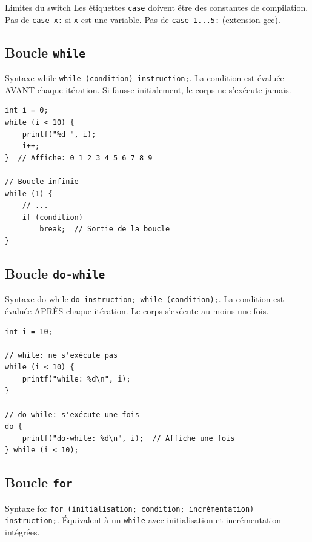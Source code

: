 \documentclass[10pt,a4paper]{article}
\begin{document}
\begin{warningbox}{Limites du switch}
Les étiquettes \texttt{case} doivent être des constantes de compilation. Pas de \texttt{case x:} si \texttt{x} est une variable. Pas de \texttt{case 1...5:} (extension gcc).
\end{warningbox}

\subsection{Boucle \texttt{while}}

\begin{definitionbox}{Syntaxe while}
\texttt{while (condition) instruction;}. La condition est évaluée AVANT chaque itération. Si fausse initialement, le corps ne s'exécute jamais.
\end{definitionbox}

\begin{lstlisting}[caption={While et condition}]
int i = 0;
while (i < 10) {
    printf("%d ", i);
    i++;
}  // Affiche: 0 1 2 3 4 5 6 7 8 9

// Boucle infinie
while (1) {
    // ...
    if (condition)
        break;  // Sortie de la boucle
}
\end{lstlisting}

\subsection{Boucle \texttt{do-while}}

\begin{definitionbox}{Syntaxe do-while}
\texttt{do instruction; while (condition);}. La condition est évaluée APRÈS chaque itération. Le corps s'exécute au moins une fois.
\end{definitionbox}

\begin{lstlisting}[caption={Do-while et exécution garantie}]
int i = 10;

// while: ne s'exécute pas
while (i < 10) {
    printf("while: %d\n", i);
}

// do-while: s'exécute une fois
do {
    printf("do-while: %d\n", i);  // Affiche une fois
} while (i < 10);
\end{lstlisting}

\subsection{Boucle \texttt{for}}

\begin{definitionbox}{Syntaxe for}
\texttt{for (initialisation; condition; incrémentation) instruction;}. Équivalent à un \texttt{while} avec initialisation et incrémentation intégrées.
\end{definitionbox}
\end{document}

